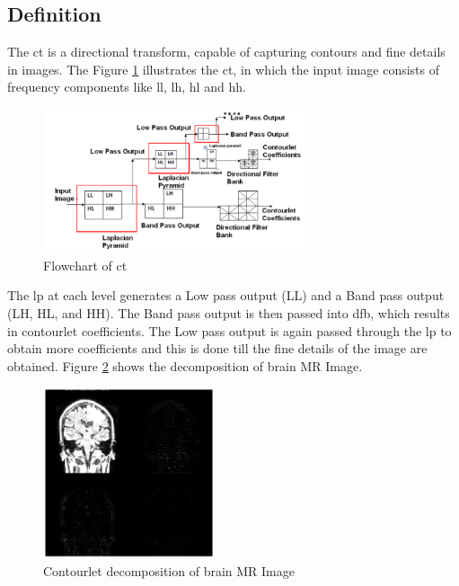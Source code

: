 \subsection{Definition}

The \gls{ct} is a directional transform, capable of capturing contours and fine details in images. The Figure \ref{fig:contourlet_2} illustrates the \gls{ct}, in which the input image consists of frequency components like \gls{ll}, \gls{lh}, \gls{hl} and \gls{hh}. 

\begin{figure}[H]
	\centering
	\includegraphics[width=0.7\textwidth]{fig/contourlet_2}
	\caption{Flowchart of \glsdesc{ct}}
	\label{fig:contourlet_2}
\end{figure}

The \gls{lp} at each level generates a Low pass output (LL) and a Band pass output (LH, HL, and HH). The Band pass output is then passed into \gls{dfb}, which
results in contourlet coefficients. The Low pass output is again passed through the \gls{lp} to obtain more coefficients and this is done till the fine details of the image are obtained. Figure \ref{fig:contourlet_mr} shows the decomposition of brain MR Image. 

\begin{figure}[H]
	\centering
	\includegraphics[width=0.45\textwidth]{fig/contourlet_mr}
	\caption{Contourlet decomposition of brain MR Image}
	\label{fig:contourlet_mr}
\end{figure}



